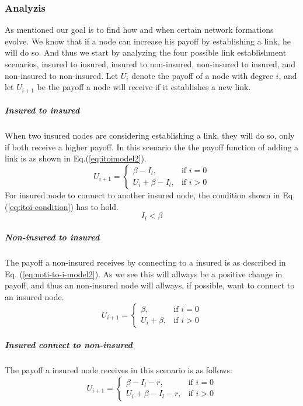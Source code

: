\subsubsection{Analyzis}
As mentioned our goal is to find how and when certain network formations evolve. We know that if a node can increase his payoff by establishing a link, he will do so. And thus we start by analyzing the four possible link establishment scenarios, insured to insured, insured to non-insured, non-insured to insured, and non-insured to non-insured. 
Let $U_{i}$ denote the payoff of a node with degree $i$, and let $U_{i+1}$ be the payoff a node will receive if it establishes a new link.
\subparagraph{Insured to insured}
When two insured nodes are considering establishing a link, they will do so, only if both receive a higher payoff.  In this scenario the the payoff function of adding a link is as shown in Eq.(\ref{eq:itoimodel2}).
\begin{equation}
    U_{i+1}= 
\begin{cases}
    \beta - I_{l},& \text{if } i = 0\\
    U_{i}+\beta -I_{l},& \text{if }  i>0
   
\end{cases}
\label{eq:itoimodel2}
\end{equation}
For insured node to connect to another insured node, the condition shown in Eq.(\ref{eq:itoi-condition}) has to hold.
\begin{equation}
I_{l}<\beta
\label{eq:itoi-condition}
\end{equation}
\subparagraph{Non-insured to insured}
The payoff a non-insured receives by connecting to a insured is as described in Eq. (\ref{eq:noti-to-i-model2}). As we see this will allways be a positive change in payoff, and thus an non-insured node will allways, if possible, want to connect to an insured node.
\begin{equation}
    U_{i+1}= 
\begin{cases}
    \beta,& \text{if } i = 0\\
    U_{i}+\beta,& \text{if }  i>0
   
\end{cases}
\label{eq:noti-to-i-model2}
\end{equation}
\subparagraph{Insured connect to non-insured}
The payoff a insured node receives in this scenario is as follows:
\begin{equation}
    U_{i+1}= 
\begin{cases}
    \beta - I_{l}-r,& \text{if } i = 0\\
    U_{i}+\beta -I_{l}-r,& \text{if }  i>0
   
\end{cases}
\label{eq:itonotimodel2}
\end{equation}
